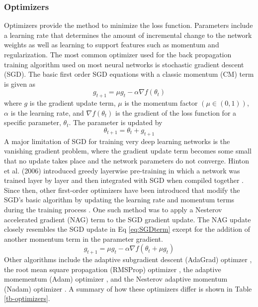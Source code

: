 \subsubsection{Optimizers}
Optimizers provide the method to minimize the loss function. Parameters include a learning rate that determines the amount of incremental change to the network weights as well as learning to support features such as momentum and regularization. The most common optimizer used for the back propagation training algorithm used on most neural networks is stochastic gradient descent (SGD). The basic first order SGD equations with a classic momentum (CM) term is given as
%
\begin{equation}
\label{eq:SGDterm}
g_{t+1} = \mu g_{t} - \alpha \nabla f (\theta_{t})
\end{equation}
%
\noindent
where $g$ is the gradient update term, $\mu$ is the momentum factor $(\mu \in (0,1))$, $\alpha$ is the learning rate, and $\nabla f (\theta_{t})$ is the gradient of the loss function for a specific parameter, $\theta_{t}$. The parameter is updated by
%
\begin{equation}
\label{eq:SGDupdate}
\theta_{t+1} = \theta_{t} + g_{t+1}
\end{equation}
%
A major limitation of SGD for training very deep learning networks is the vanishing gradient problem, where the gradient update term becomes some small that no update takes place and the network parameters do not converge. Hinton et al. (2006) introduced greedy layerwise pre-training in which a network was trained layer by layer and then integrated with SGD when compiled together \citep{Hinton2006}. Since then, other first-order optimizers have been introduced that modify the SGD's basic algorithm by updating the learning rate and momentum terms during the training process \citep{Sutskever2013}.  One such method was to apply a Nesterov accelerated gradient (NAG) \citep{Nesterov1983} term to the SGD gradient update. The NAG update closely resembles the SGD update in Eq \ref{eq:SGDterm} except for the addition of another momentum term in the parameter gradient.
%
\begin{equation}
\label{eq:SGD-NAG}
g_{t+1} = \mu g_{t} - \alpha \nabla f (\theta_{t} + \mu g_{t})
\end{equation}
%
Other algorithms include the adaptive subgradient descent (AdaGrad) optimzer \citep{Duchi2011}, the root mean square propagation (RMSProp) optimizer \citep{Tieleman2012}, the adaptive momementum (Adam) optimizer \citep{Kingma2014}, and the Nesterov adaptive momentum (Nadam) optimizer \citep{Dozat2016}. A summary of how these optimizers differ is shown in Table \ref{tb-optimizers}.
